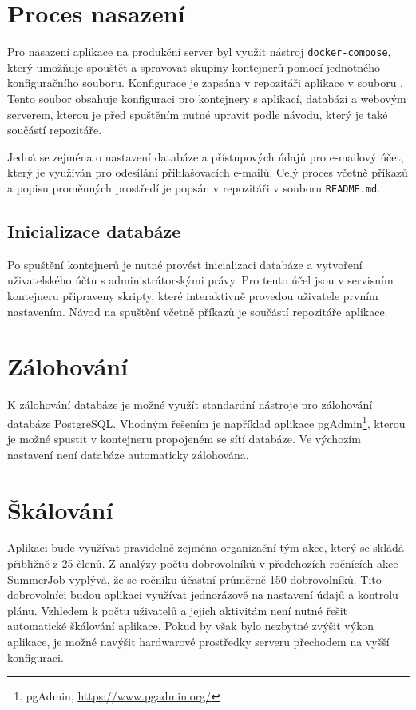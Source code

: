 \section{Proces nasazení}

Pro nasazení aplikace na produkční server byl využit nástroj \texttt{docker-compose}, který
umožňuje spouštět a spravovat skupiny kontejnerů pomocí jednotného konfiguračního souboru.
Konfigurace je zapsána v repozitáři aplikace v souboru .
Tento soubor obsahuje konfiguraci pro kontejnery s aplikací, databází a webovým serverem, kterou 
je před spuštěním nutné upravit podle návodu, který je také součástí repozitáře.

Jedná se zejména o nastavení databáze a přístupových údajů pro e-mailový účet, který je využíván
pro odesílání přihlašovacích e-mailů. Celý proces včetně příkazů a popisu proměnných prostředí je popsán
v repozitáři v souboru \texttt{README.md}.

\subsection{Inicializace databáze}

Po spuštění kontejnerů je nutné provést inicializaci databáze
a vytvoření uživatelského účtu s administrátorskými právy. Pro tento účel jsou v servisním kontejneru připraveny skripty,
které interaktivně provedou uživatele prvním nastavením. Návod na spuštění včetně příkazů je součástí repozitáře aplikace.

\section{Zálohování}

K zálohování databáze je možné využít standardní nástroje pro zálohování databáze PostgreSQL.
Vhodným řešením je například aplikace pgAdmin\footnote{pgAdmin, \url{https://www.pgadmin.org/}}, kterou
je možné spustit v kontejneru propojeném se sítí databáze.
Ve výchozím nastavení není databáze automaticky zálohována.

\section{Škálování}

 Aplikaci bude využívat
pravidelně zejména organizační tým akce, který se skládá přibližně z 25 členů. Z analýzy počtu dobrovolníků v předchozích ročnících akce SummerJob vyplývá, že
se ročníku účastní průměrně 150 dobrovolníků. Tito dobrovolníci budou aplikaci využívat jednorázově na nastavení údajů a kontrolu plánu.
Vzhledem k počtu uživatelů a jejich aktivitám není nutné řešit automatické škálování aplikace. Pokud by však bylo nezbytné
zvýšit výkon aplikace, je možné navýšit hardwarové prostředky serveru přechodem na vyšší konfiguraci.